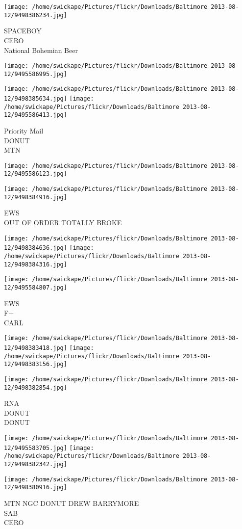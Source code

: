\documentclass[10pt,letterpaper]{article}
\begin{document}
\vspace{0.25in}
\texttt{[image: /home/swickape/Pictures/flickr/Downloads/Baltimore 2013-08-12/9498386234.jpg]}

SPACEBOY\\
CERO\\
National Bohemian Beer
\pagebreak

\texttt{[image: /home/swickape/Pictures/flickr/Downloads/Baltimore 2013-08-12/9495586995.jpg]}

\vspace{0.25in}
\texttt{[image: /home/swickape/Pictures/flickr/Downloads/Baltimore 2013-08-12/9498385634.jpg]}
\texttt{[image: /home/swickape/Pictures/flickr/Downloads/Baltimore 2013-08-12/9495586413.jpg]}

Priority Mail\\
DONUT\\
MTN
\pagebreak

\texttt{[image: /home/swickape/Pictures/flickr/Downloads/Baltimore 2013-08-12/9495586123.jpg]}

\vspace{0.25in}
\texttt{[image: /home/swickape/Pictures/flickr/Downloads/Baltimore 2013-08-12/9498384916.jpg]}

EWS\\
OUT OF ORDER TOTALLY BROKE
\pagebreak

\texttt{[image: /home/swickape/Pictures/flickr/Downloads/Baltimore 2013-08-12/9498384636.jpg]}
\texttt{[image: /home/swickape/Pictures/flickr/Downloads/Baltimore 2013-08-12/9498384316.jpg]}

\vspace{0.25in}
\texttt{[image: /home/swickape/Pictures/flickr/Downloads/Baltimore 2013-08-12/9495584807.jpg]}

EWS\\
F+\\
CARL
\pagebreak

\texttt{[image: /home/swickape/Pictures/flickr/Downloads/Baltimore 2013-08-12/9498383418.jpg]}
\texttt{[image: /home/swickape/Pictures/flickr/Downloads/Baltimore 2013-08-12/9498383156.jpg]}

\vspace{0.25in}
\texttt{[image: /home/swickape/Pictures/flickr/Downloads/Baltimore 2013-08-12/9498382854.jpg]}

RNA\\
DONUT\\
DONUT
\pagebreak

\texttt{[image: /home/swickape/Pictures/flickr/Downloads/Baltimore 2013-08-12/9495583705.jpg]}
\texttt{[image: /home/swickape/Pictures/flickr/Downloads/Baltimore 2013-08-12/9498382342.jpg]}

\vspace{0.25in}
\texttt{[image: /home/swickape/Pictures/flickr/Downloads/Baltimore 2013-08-12/9498380916.jpg]}

MTN NGC DONUT DREW BARRYMORE\\
SAB\\
CERO
\pagebreak
\end{document}
